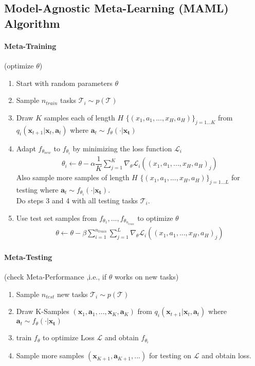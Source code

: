\documentclass{article}
\begin{document}
\subsection{Model-Agnostic Meta-Learning (MAML) Algorithm}
\paragraph{Meta-Training} (optimize $\theta$) 
\begin{enumerate}
	\item Start with random parameters $\theta$
	\item Sample $n_{train}$ tasks $\mathcal{T}_i \sim p(\mathcal{T})$
	\item Draw $K$ samples each of length $H$ $\{(x_1, a_1, ..., x_H, a_H)\}_{j=1...K}$ from $q_i(\boldsymbol{x}_{t+1} \vert \boldsymbol{x}_t, \boldsymbol{a}_t)$ where $\boldsymbol{a}_t \sim f_{\theta}( \cdot \vert \boldsymbol{x_t})$
	\item Adapt $f_{\theta_{new}}$ to $f_{\theta_i}$ by minimizing the loss function $\mathcal{L}_i$
	\begin{align}
		\theta_i \leftarrow \theta - \alpha \dfrac{1}{K} \sum_{j=1}^{K} \nabla_{\theta} \mathcal{L}_i((x_1,a_1,...,x_H,a_H)_j)
	\end{align}
	Also sample more samples of length $H$ $\{(x_1, a_1, ..., x_H, a_H)\}_{j=1...L}$ for testing where $\boldsymbol{a}_t \sim f_{\theta_i}( \cdot \vert \boldsymbol{x_t})$.\\
	Do steps 3 and 4 with all testing tasks $\mathcal{T}_i$.
	\item  Use test set samples from $f_{\theta_1}, ..., f_{\theta_{n_{train}}}$ to optimize $\theta$
	\begin{align}
		\theta \leftarrow \theta - \beta \sum_{i=1}^{n_{train}} \sum_{j=1}^{L} \nabla_{\theta} \mathcal{L}_i((x_1,a_1,...,x_H,a_H)_j)
	\end{align}
\end{enumerate}
\paragraph{Meta-Testing} (check Meta-Performance ,i.e., if $\theta$ works on new tasks)
\begin{enumerate}
	\item Sample $n_{test}$ new tasks $\mathcal{T}_i \sim p(\mathcal{T})$
	\item Draw K-Samples $(\boldsymbol{x}_1, \boldsymbol{a}_1, ..., \boldsymbol{x}_K, \boldsymbol{a}_K)$ from $q_i(\boldsymbol{x}_{t+1} \vert \boldsymbol{x}_t, \boldsymbol{a}_t)$ where $\boldsymbol{a}_t \sim f_{\theta}( \cdot \vert \boldsymbol{x_t})$
	\item train $f_\theta$ to optimize Loss $\mathcal{L}$ and obtain $f_{\theta_i}$
	\item Sample more samples $(\boldsymbol{x}_{K+1}, \boldsymbol{a}_{K+1}, ...)$ for testing on $\mathcal{L}$ and obtain loss. 
\end{enumerate}
	
\end{document}
